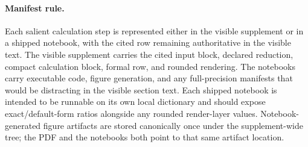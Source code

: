 \paragraph{Manifest rule.} Each salient calculation step is represented either in the visible supplement or in a shipped notebook, with the cited row remaining authoritative in the visible text. The visible supplement carries the cited input block, declared reduction, compact calculation block, formal row, and rounded rendering. The notebooks carry executable code, figure generation, and any full-precision manifests that would be distracting in the visible section text. Each shipped notebook is intended to be runnable on its own local dictionary and should expose exact/default-form ratios alongside any rounded render-layer values. Notebook-generated figure artifacts are stored canonically once under the supplement-wide  tree; the PDF and the notebooks both point to that same artifact location.
